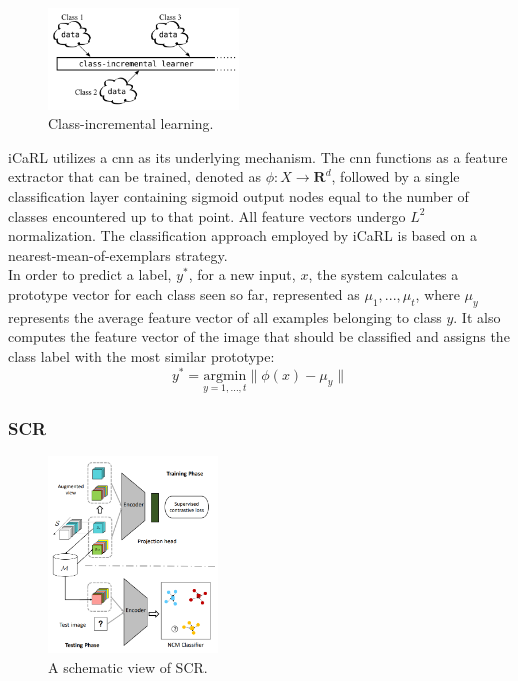 \begin{figure}\includegraphics[width=0.45\textwidth]{Images//class_incremental_learning.png}
    \caption{Class-incremental learning. \citep{rebuffi2017icarl}}
    \label{fig:icarl}
\end{figure}


iCaRL utilizes a \acrshort{cnn} as its underlying mechanism. The \acrshort{cnn} functions as a feature extractor that can be trained, denoted as $\phi: X \rightarrow \mathbf{R}^{d}$, followed by a single classification layer containing sigmoid output nodes equal to the number of classes encountered up to that point. All feature vectors undergo $L^{2}$ normalization. The classification approach employed by iCaRL is based on a nearest-mean-of-exemplars strategy.\\
In order to predict a label, $y^{*}$, for a new input, $x$, the system calculates a prototype vector for each class seen so far, represented as $\mu_{1}, ..., \mu_{t}$, where $\mu_{y}$ represents the average feature vector of all examples belonging to class $y$. It also computes the feature vector of the image that should be classified and assigns the class label with the most similar prototype: 
\[
y^{*} = \underset{y=1,...,t}{\mathrm{argmin }} \| \phi(x) - \mu_{y} \|
\]

\subsubsection{SCR}
\label{sec:SCR}
\begin{figure}
    \includegraphics[width=0.40\textwidth]{Images/scr_architecture.png}
    \caption{A schematic view of SCR. \citep{mai2021supervised}}
    \label{fig:scr_architecture}
\end{figure}

